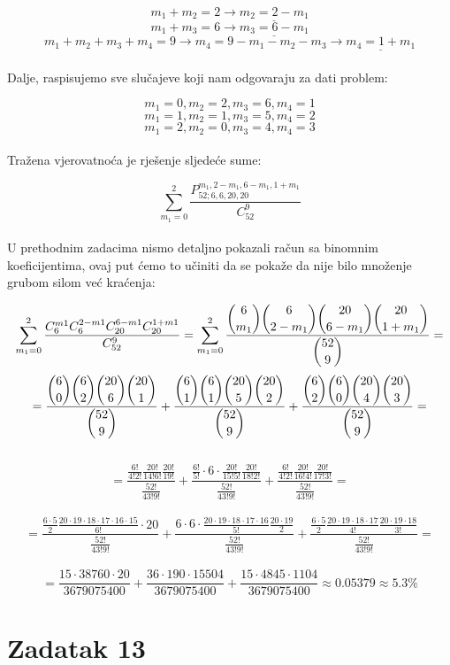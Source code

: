 \documentclass[12pt]{article}
\begin{document}
$$m_{1} + m_2 = 2 \to \underline{m_2 = 2 - m_1}$$
$$m_1 + m_3 = 6 \to \underline{m_3 = 6 - m_1}$$ 
$$m_1 + m_2 + m_3 + m_4 = 9 \to m_4 = 9 - m_1 - m_2 - m_3 \to \underline{m_4 = 1 + m_1}$$\\

Dalje, raspisujemo sve slučajeve koji nam odgovaraju za dati problem:

$$m_1 = 0, m_2 = 2, m_3 = 6, m_4 = 1$$
$$m_1 = 1, m_2 = 1, m_3 = 5, m_4 = 2$$
$$m_1 = 2, m_2 = 0, m_3 = 4, m_4 = 3$$\\

Tražena vjerovatnoća je rješenje sljedeće sume:

$$\sum_{m_1 = 0}^{2} \frac{P_{52; 6, 6, 20, 20}^{m_1, 2 - m_1, 6 - m_1, 1 + m_1}}{C_{52}^9}$$\\

U prethodnim zadacima nismo detaljno pokazali račun sa binomnim koeficijentima, ovaj put ćemo to učiniti da se pokaže da nije bilo množenje grubom silom već kraćenja:

$$\sum_{m_1 = 0}^{2} \frac{C_6^{m1} C_6^{2-m1} C_{20}^{6-m1} C_{20}^{1+m1}}{C_{52}^9} = \sum_{m_1=0}^2 \frac{\dbinom{6}{m_1} \dbinom{6}{2 - m_1} \dbinom{20}{6 - m_1} \dbinom{20}{1+m_1}}{\dbinom{52}{9}} = $$
$$ = \frac{\dbinom{6}{0} \dbinom{6}{2} \dbinom{20}{6} \dbinom{20}{1}}{\dbinom{52}{9}} + \frac{\dbinom{6}{1} \dbinom{6}{1} \dbinom{20}{5} \dbinom{20}{2}}{\dbinom{52}{9}} + \frac{\dbinom{6}{2} \dbinom{6}{0} \dbinom{20}{4} \dbinom{20}{3}}{\dbinom{52}{9}} =$$\\
$$= \frac{ \frac{6!}{4! 2!} \frac{20!}{14! 6!} \frac{20!}{19!} }{ \frac{52!}{43! 9!} } + \frac{ \frac{6!}{5!}\cdot 6 \cdot \frac{20!}{15! 5!} \frac{20!}{18! 2!}}{ \frac{52!}{43! 9!} } + \frac{ \frac{6!}{4!2!} \frac{20!}{16!4!} \frac{20!}{17!3!} }{ \frac{52!}{43!9!} } =$$\\
$$= \frac{ \frac{6 \cdot 5}{2}  \frac{20 \cdot 19 \cdot 18 \cdot 17 \cdot 16 \cdot 15}{6!} \cdot 20 }{\frac{52!}{43! 9!}} + \frac{ 6 \cdot 6 \cdot \frac{20 \cdot 19 \cdot 18 \cdot 17 \cdot 16}{5!} \frac{20 \cdot 19}{2} }{\frac{52!}{43! 9!}} + \frac{ \frac{6 \cdot 5}{2}  \frac{20 \cdot 19 \cdot 18 \cdot 17}{4!} \frac{20 \cdot 19 \cdot 18}{3!} }{\frac{52!}{43! 9!}} =$$\\
$$= \frac{15 \cdot 38760 \cdot 20}{3679075400} + \frac{36 \cdot 190 \cdot 15504}{3679075400} + \frac{15 \cdot 4845 \cdot 1104}{3679075400} \approx 0.05379 \approx 5.3\%$$

\newpage
\section*{Zadatak 13\label{Z13}}	 
\end{document}
